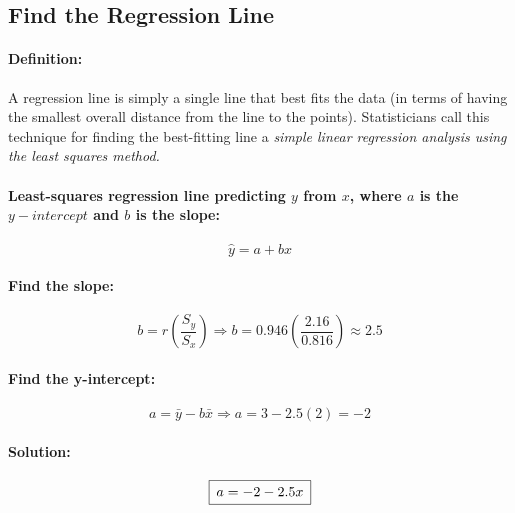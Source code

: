 \documentclass[12pt]{article}
\newcommand{\padBox}[1]{{\setlength\fboxsep{5pt}\boxed{#1}}}
\begin{document}
\subsection{Find the Regression Line}
\paragraph{Definition:}
A regression line is simply a single line that best fits the data (in terms of having the smallest overall distance from the line to the points). Statisticians call this technique for finding the best-fitting line a \emph{simple linear regression analysis using the least squares method.}

\paragraph{Least-squares regression line predicting $y$ from $x$, where $a$ is the $y-intercept$ and $b$ is the slope:}
\begin{equation}
	\hat{y} = a + bx
\end{equation}


\paragraph{Find the slope:}
	\begin{equation}
		b = r\left(\frac{S_{y}}{S_{x}}\right) \Rightarrow
		b = 0.946\left(\frac{2.16}{0.816}\right) \approx 2.5
	\end{equation}

\paragraph{Find the y-intercept:}
\begin{equation}
	a = \bar{y} - b\bar{x} \Rightarrow a = 3 - 2.5(2) = -2
\end{equation}

\paragraph{Solution:}
\begin{equation}
	\padBox{a = -2 - 2.5x}
\end{equation}
\end{document}
